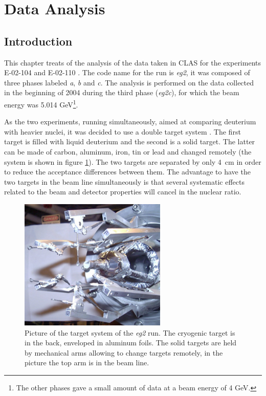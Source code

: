 \section{Data Analysis}
\label{chap:analysis}

\subsection{Introduction}

This chapter treats of the analysis of the data taken in CLAS for the 
experiments E-02-104 \cite{Brooks:2002aa} and E-02-110 \cite{Hafidi:2002aa}.
The code name for the run is {\it eg2}, it was composed of three phases 
labeled {\it a}, {\it b} and {\it c}. The analysis is performed on the data 
collected in the beginning of 2004 during the third phase ({\it eg2c}), for 
which the beam energy was 5.014 GeV\footnote{The other phases gave a small 
amount of data at a beam energy of 4 GeV.}.

As the two experiments, running simultaneously, aimed at comparing deuterium 
with heavier nuclei, it was decided to use a double target system 
\cite{Hakobyan:2008zz}. The first target is filled with liquid deuterium and 
the second is a solid target. The latter can be made of carbon, aluminum, 
iron, tin or lead and changed remotely (the system is shown in figure 
\ref{fig:phototarget}). The two targets are separated by only 4~cm in order to reduce
the acceptance differences between them. The 
advantage to have the two targets in the beam line simultaneously
is that several systematic effects related to the beam 
and detector properties will cancel in the nuclear ratio.

\begin{figure}[htbp]
\centering
\includegraphics[width=7cm] {chap5-fig/PhTar.jpg} 
\caption {Picture of the target system of the {\it eg2} run. The cryogenic target is 
in the back, enveloped in aluminum foils. The solid targets are held by mechanical arms
allowing to change targets remotely, in the picture the top arm is in the beam line.}
\label{fig:phototarget}
\end{figure}

